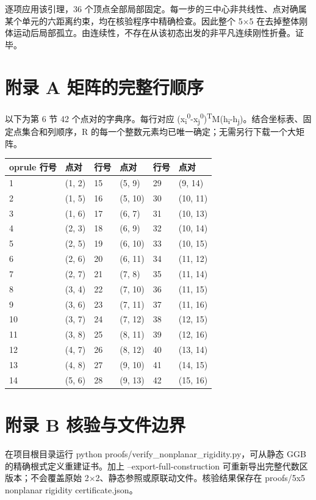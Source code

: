 \documentclass[UTF8,a4paper,11pt]{ctexart}
\begin{document}
逐项应用该引理，36 个顶点全部局部固定。每一步的三中心非共线性、点对确属某个单元的六距离约束，均在核验程序中精确检查。因此整个 5\(\times\)5 在去掉整体刚体运动后局部孤立。由连续性，不存在从该初态出发的非平凡连续刚性折叠。证毕。

\newpage
\section*{附录 A  矩阵的完整行顺序}
以下为第 6 节 42 个点对的字典序。每行对应 (x\textsubscript{i}\textsuperscript{0}-x\textsubscript{j}\textsuperscript{0})\textsuperscript{T}M(h\textsubscript{i}-h\textsubscript{j})。结合坐标表、固定点集合和列顺序，R 的每一个整数元素均已唯一确定；无需另行下载一个大矩阵。

\begin{longtable}{llllll}	oprule
行号 & 点对 & 行号 & 点对 & 行号 & 点对 \\ \midrule
1 & (1, 2) & 15 & (5, 9) & 29 & (9, 14) \\
2 & (1, 5) & 16 & (5, 10) & 30 & (10, 11) \\
3 & (1, 6) & 17 & (6, 7) & 31 & (10, 13) \\
4 & (2, 3) & 18 & (6, 9) & 32 & (10, 14) \\
5 & (2, 5) & 19 & (6, 10) & 33 & (10, 15) \\
6 & (2, 6) & 20 & (6, 11) & 34 & (11, 12) \\
7 & (2, 7) & 21 & (7, 8) & 35 & (11, 14) \\
8 & (3, 4) & 22 & (7, 10) & 36 & (11, 15) \\
9 & (3, 6) & 23 & (7, 11) & 37 & (11, 16) \\
10 & (3, 7) & 24 & (7, 12) & 38 & (12, 15) \\
11 & (3, 8) & 25 & (8, 11) & 39 & (12, 16) \\
12 & (4, 7) & 26 & (8, 12) & 40 & (13, 14) \\
13 & (4, 8) & 27 & (9, 10) & 41 & (14, 15) \\
14 & (5, 6) & 28 & (9, 13) & 42 & (15, 16) \\
\bottomrule\end{longtable}
\section*{附录 B  核验与文件边界}
在项目根目录运行 python proofs/verify\_nonplanar\_rigidity.py，可从静态 GGB 的精确根式定义重建证书。加上 --export-full-construction 可重新导出完整代数区版本；不会覆盖原始 2\(\times\)2、静态参照或原联动文件。核验结果保存在 proofs/5x5 nonplanar rigidity certificate.json。
\end{document}
